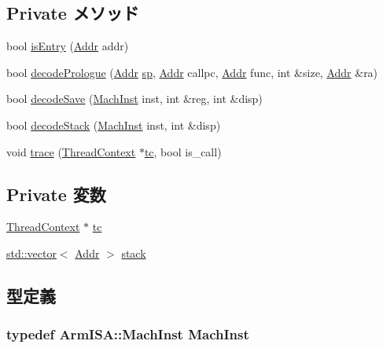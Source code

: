 \subsection*{Private メソッド}
\begin{DoxyCompactItemize}
\item 
bool \hyperlink{classArmISA_1_1StackTrace_a8c9787d05f9c0e82dfcaf31cf0fd4b50}{isEntry} (\hyperlink{classm5_1_1params_1_1Addr}{Addr} addr)
\item 
bool \hyperlink{classArmISA_1_1StackTrace_a875eea16b2891accc8cbec7eb6c36003}{decodePrologue} (\hyperlink{classm5_1_1params_1_1Addr}{Addr} \hyperlink{namespaceArmISA_abec75b7aaa6ffc77683fc30a8b8abdba}{sp}, \hyperlink{classm5_1_1params_1_1Addr}{Addr} callpc, \hyperlink{classm5_1_1params_1_1Addr}{Addr} func, int \&size, \hyperlink{classm5_1_1params_1_1Addr}{Addr} \&ra)
\item 
bool \hyperlink{classArmISA_1_1StackTrace_ae56dad5982b67d8717714c383b6a59f8}{decodeSave} (\hyperlink{classArmISA_1_1StackTrace_a3a3dd20a48fea6956428bc5567ce9e9d}{MachInst} inst, int \&reg, int \&disp)
\item 
bool \hyperlink{classArmISA_1_1StackTrace_a61ba7618f77dc6e62d7b0baf6273130c}{decodeStack} (\hyperlink{classArmISA_1_1StackTrace_a3a3dd20a48fea6956428bc5567ce9e9d}{MachInst} inst, int \&disp)
\item 
void \hyperlink{classArmISA_1_1StackTrace_a46d6b95a2e5fdb75702cf45e39566645}{trace} (\hyperlink{classThreadContext}{ThreadContext} $\ast$\hyperlink{classArmISA_1_1StackTrace_a4455a4759e69e5ebe68ae7298cbcc37d}{tc}, bool is\_\-call)
\end{DoxyCompactItemize}
\subsection*{Private 変数}
\begin{DoxyCompactItemize}
\item 
\hyperlink{classThreadContext}{ThreadContext} $\ast$ \hyperlink{classArmISA_1_1StackTrace_a4455a4759e69e5ebe68ae7298cbcc37d}{tc}
\item 
\hyperlink{classstd_1_1vector}{std::vector}$<$ \hyperlink{classm5_1_1params_1_1Addr}{Addr} $>$ \hyperlink{classArmISA_1_1StackTrace_a8be39169db4f31c77f5188de23c602f1}{stack}
\end{DoxyCompactItemize}


\subsection{型定義}
\hypertarget{classArmISA_1_1StackTrace_a3a3dd20a48fea6956428bc5567ce9e9d}{
\subsubsection[{MachInst}]{\setlength{\rightskip}{0pt plus 5cm}typedef {\bf ArmISA::MachInst} {\bf MachInst}}}
\label{classArmISA_1_1StackTrace_a3a3dd20a48fea6956428bc5567ce9e9d}


